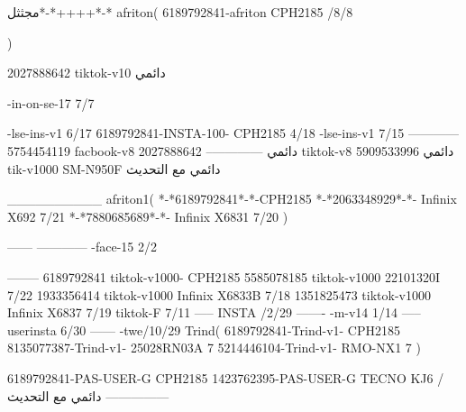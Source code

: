 مجثثل*-*++++*-*
afriton(
6189792841-afriton CPH2185  /8/8

)

2027888642 tiktok-v10
دائمي

-in-on-se-17 7/7

-lse-ins-v1 6/17
6189792841-INSTA-100- CPH2185 4/18
-lse-ins-v1 7/15
------------
5754454119 facbook-v8
دائمي
--------------
2027888642 tiktok-v8
دائمي
5909533996 tik-v1000  SM-N950F
دائمي مع التحديث

__________
afriton1(
*-*6189792841*-*-CPH2185
*-*2063348929*-*-  Infinix X692  7/21
*-*7880685689*-*-   Infinix X6831  7/20
)


------
------------
-face-15 2/2

--------
6189792841 tiktok-v1000- CPH2185 
5585078185 tiktok-v1000 22101320I  7/22
1933356414 tiktok-v1000 Infinix X6833B  7/18
1351825473 tiktok-v1000 Infinix X6837  7/19
 tiktok-F   7/11
-----
 INSTA /2/29
-------
-m-v14 1/14
-----
userinsta 6/30
------
-twe/10/29
Trind(
6189792841-Trind-v1- CPH2185 
8135077387-Trind-v1- 25028RN03A 7
5214446104-Trind-v1- RMO-NX1 7
)


6189792841-PAS-USER-G CPH2185 
1423762395-PAS-USER-G TECNO KJ6  /دائمي مع التحديث
    ---------------
